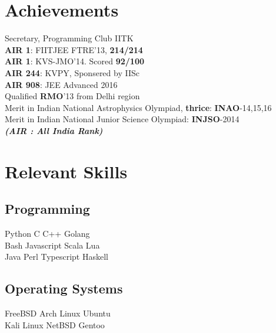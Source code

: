 \documentclass[]{deedy-resume-openfont}
\begin{document}
\begin{minipage}[t]{0.30\textwidth}
\section{Achievements}
\vspace{0.1cm}
Secretary, Programming Club IITK \\
\vspace{0.1cm}
\textbf{AIR 1}: FIITJEE FTRE'13, \textbf{214/214}\\
\vspace{0.1cm}
\textbf{AIR 1}: KVS-JMO'14. Scored \textbf{92/100}\\
\vspace{0.1cm}
\textbf{AIR 244}: KVPY, Sponsered by IISc \\
\vspace{0.1cm}
\textbf{AIR 908}: JEE Advanced 2016\\
\vspace{0.1cm}
Qualified \textbf{RMO}'13 from Delhi region\\
\vspace{0.1cm}
Merit in Indian National Astrophysics Olympiad, \textbf{thrice}: \textbf{INAO}-14,15,16 \\
\vspace{0.1cm}
Merit in Indian National Junior Science Olympiad: \textbf{INJSO}-2014 \\

{\footnotesize \textit{\textbf{ (AIR : All India Rank)}}}


\section{Relevant Skills}
\subsection{Programming}
Python \textbullet{} C \textbullet{} C++ \textbullet{} Golang \\
 \vspace{0.1 cm}
Bash \textbullet{} Javascript \textbullet{} Scala \textbullet{} Lua \\
 Java \textbullet{} Perl \textbullet{} Typescript \textbullet{} Haskell \\
\vspace{0.4 cm}
\subsection{Operating Systems}
FreeBSD \textbullet{} Arch Linux \textbullet{} Ubuntu \\
Kali Linux \textbullet{} NetBSD \textbullet{} Gentoo
\vspace{0.4 cm}

\end{minipage}
\end{document}
